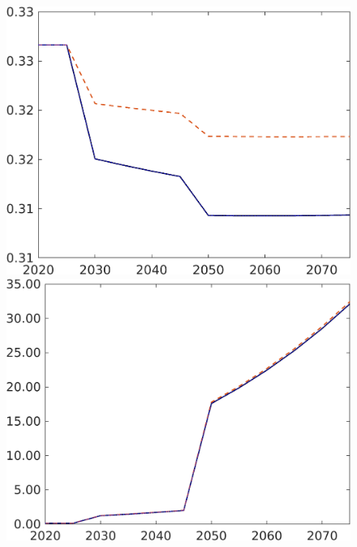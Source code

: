 \begin{figure}[h!!]
\begin{minipage}[]{0.32\textwidth}
	\end{minipage}
	\begin{minipage}[]{0.32\textwidth}
		\includegraphics[width=1\textwidth]{../../codding_model/own_basedOnFried/optimalPol_190722_tidiedUp/figures/all_July22/hl_CompEffOPT_T_NoTaus_pol4_spillover0_noskill0_sep1_xgrowth1_etaa0.79_lgd0_lff0.png}
	\end{minipage}
	\begin{minipage}[]{0.32\textwidth}
		\includegraphics[width=1\textwidth]{../../codding_model/own_basedOnFried/optimalPol_190722_tidiedUp/figures/all_July22/GFF_CompEffOPT_T_NoTaus_pol4_spillover0_noskill0_sep1_xgrowth1_etaa0.79_lgd0_lff0.png}

\end{minipage}
\end{figure}
